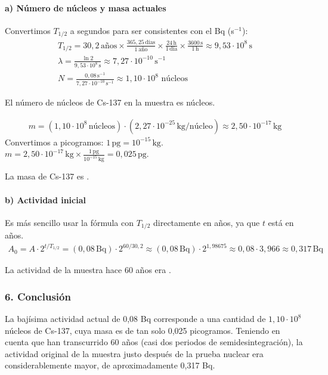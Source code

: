 \paragraph*{a) Número de núcleos y masa actuales}
Convertimos $T_{1/2}$ a segundos para ser consistentes con el Bq (s$^{-1}$):
\begin{gather}
    T_{1/2} = 30,2 \, \text{años} \times \frac{365,25 \, \text{días}}{1 \, \text{año}} \times \frac{24 \, \text{h}}{1 \, \text{día}} \times \frac{3600 \, \text{s}}{1 \, \text{h}} \approx 9,53 \cdot 10^8 \, \text{s} \\
    \lambda = \frac{\ln 2}{9,53 \cdot 10^8 \, \text{s}} \approx 7,27 \cdot 10^{-10} \, \text{s}^{-1} \\
    N = \frac{0,08 \, \text{s}^{-1}}{7,27 \cdot 10^{-10} \, \text{s}^{-1}} \approx 1,10 \cdot 10^8 \text{ núcleos}
\end{gather}
\begin{cajaresultado}
    El número de núcleos de Cs-137 en la muestra es  núcleos.
\end{cajaresultado}
\begin{gather}
    m = (1,10 \cdot 10^8 \, \text{núcleos}) \cdot (2,27 \cdot 10^{-25} \, \text{kg/núcleo}) \approx 2,50 \cdot 10^{-17} \, \text{kg}
\end{gather}
Convertimos a picogramos: $1 \, \text{pg} = 10^{-15} \, \text{kg}$.
$ m = 2,50 \cdot 10^{-17} \, \text{kg} \times \frac{1 \, \text{pg}}{10^{-15} \, \text{kg}} = 0,025 \, \text{pg}$.
\begin{cajaresultado}
    La masa de Cs-137 es .
\end{cajaresultado}
\paragraph*{b) Actividad inicial}
Es más sencillo usar la fórmula con $T_{1/2}$ directamente en años, ya que $t$ está en años.
\begin{gather}
    A_0 = A \cdot 2^{t/T_{1/2}} = (0,08 \, \text{Bq}) \cdot 2^{60/30,2} \approx (0,08 \, \text{Bq}) \cdot 2^{1,98675} \approx 0,08 \cdot 3,966 \approx 0,317 \, \text{Bq}
\end{gather}
\begin{cajaresultado}
    La actividad de la muestra hace 60 años era .
\end{cajaresultado}

\subsubsection*{6. Conclusión}
\begin{cajaconclusion}
La bajísima actividad actual de 0,08 Bq corresponde a una cantidad de $1,10 \cdot 10^8$ núcleos de Cs-137, cuya masa es de tan solo 0,025 picogramos. Teniendo en cuenta que han transcurrido 60 años (casi dos periodos de semidesintegración), la actividad original de la muestra justo después de la prueba nuclear era considerablemente mayor, de aproximadamente 0,317 Bq.
\end{cajaconclusion}
\newpage
